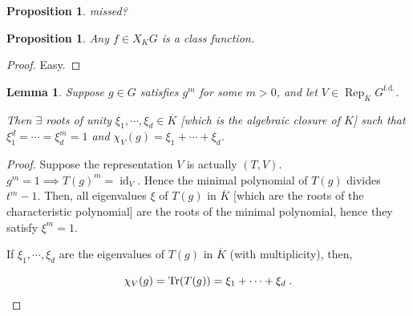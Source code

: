 \documentclass{article}
\theoremstyle{definition}
\theoremstyle{plain}
\newtheorem{proposition}[theorem]{Proposition}
\newtheorem{lemma}[theorem]{Lemma}
\theoremstyle{remark}
\begin{document}
    \begin{proposition}
        missed?
    \end{proposition}

    \begin{proposition}
        Any \(f\in X_K G\) is a class function.
    \end{proposition}

    \begin{proof}
        Easy.
    \end{proof}

    \begin{lemma}
        Suppose \(g\in G\) satisfies \(g^m\) for some \(m > 0\), and let \(V\in \operatorname{Rep}_K G^{\text{f.d.}}\).

        Then \(\exists\) roots of unity \(\xi_1 , \cdots , \xi_d \in \overline{K}\) [which is the algebraic closure of \(K\)] such that \(\xi_1^d = \cdots =\xi_d^m = 1\) and \(\chi_V(g) = \xi_1 + \cdots + \xi_d\). 
    \end{lemma}

    \begin{proof}
        Suppose the representation \(V\) is actually \((T,V)\). \(g^m = 1 \implies T(g)^m =\operatorname{id}_{V}\). Hence the minimal polynomial of \(T(g)\) divides \(t^m - 1\). Then, all eigenvalues \(\xi\) of \(T(g)\) in \(\overline{K}\) [which are the roots of the characteristic polynomial] are the roots of the minimal polynomial, hence they satisfy \(\xi^m = 1\).
        
        If \(\xi_1 , \cdots , \xi_d\) are the eigenvalues of \(T(g)\) in \(\overline{K}\) (with multiplicity), then, 
        
        \[
            \chi_V(g) = \Tr(T(g)) = \xi_1 + \cdots + \xi_d\;.
        \]
    \end{proof}
\end{document}
